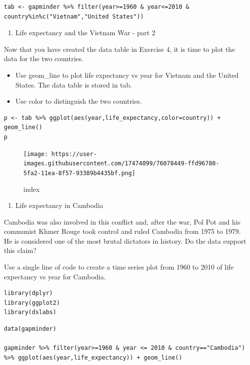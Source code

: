 \documentclass[
]{article}
\providecommand{\tightlist}{%
  \setlength{\itemsep}{0pt}\setlength{\parskip}{0pt}}
\begin{document}
\begin{verbatim}
tab <- gapminder %>% filter(year>=1960 & year<=2010 & country%in%c("Vietnam","United States"))
\end{verbatim}

\begin{enumerate}
\def\labelenumi{\arabic{enumi}.}
\setcounter{enumi}{4}
\tightlist
\item
  Life expectancy and the Vietnam War - part 2
\end{enumerate}

Now that you have created the data table in Exercise 4, it is time to
plot the data for the two countries.

\begin{itemize}
\tightlist
\item
  Use geom\_line to plot life expectancy vs year for Vietnam and the
  United States. The data table is stored in tab.
\item
  Use color to distinguish the two countries.
\end{itemize}

\begin{verbatim}
p <- tab %>% ggplot(aes(year,life_expectancy,color=country)) + geom_line()
p
\end{verbatim}

\begin{figure}
\centering
\texttt{[image: https://user-images.githubusercontent.com/17474099/76078449-ffd96780-5fa2-11ea-8f57-93389b4435bf.png]}
\caption{index}
\end{figure}

\begin{enumerate}
\def\labelenumi{\arabic{enumi}.}
\setcounter{enumi}{5}
\tightlist
\item
  Life expectancy in Cambodia
\end{enumerate}

Cambodia was also involved in this conflict and, after the war, Pol Pot
and his communist Khmer Rouge took control and ruled Cambodia from 1975
to 1979. He is considered one of the most brutal dictators in history.
Do the data support this claim?

Use a single line of code to create a time series plot from 1960 to 2010
of life expectancy vs year for Cambodia.

\begin{verbatim}
library(dplyr)
library(ggplot2)
library(dslabs)
\end{verbatim}

\begin{verbatim}
data(gapminder)

gapminder %>% filter(year>=1960 & year <= 2010 & country=="Cambodia") %>% ggplot(aes(year,life_expectancy)) + geom_line()
\end{verbatim}
\end{document}
